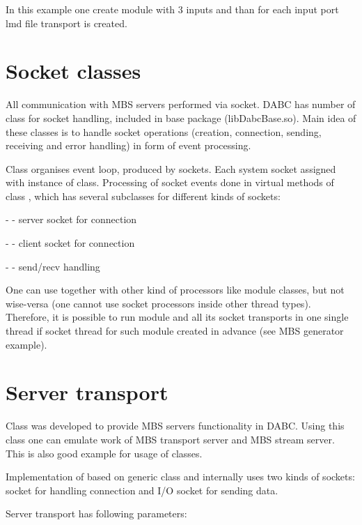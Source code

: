 In this example one create module with 3 inputs and than for each input port lmd file transport is created.


\section{Socket classes}

All communication with MBS servers performed via socket. DABC has number
of class for socket handling, included in base package (libDabcBase.so).
Main idea of these classes is to handle socket operations (creation, connection, sending, receiving and 
error handling) in form of event processing. 

Class  organises event loop, produced by sockets.
Each system socket assigned with instance of  class. 
Processing of socket events done in virtual methods
of class , which has several subclasses for different 
kinds of sockets: 
\bbul
\item  -  - server socket for connection  
\item  -  - client socket for connection  
\item  -  - send/recv handling  
\ebul

One can use  together with other kind of processors
like module classes, but not wise-versa (one cannot use socket processors inside other
thread types). Therefore, it is possible to run module and all its
socket transports in one single thread if socket thread for such module created in
advance (see MBS generator example).
  

\section{Server transport}

Class  was developed to provide MBS servers functionality in DABC.
Using this class one can emulate work of MBS transport server and MBS stream server. 
This is also good example for usage of  classes.

Implementation of  based on generic class  and 
internally uses two kinds of sockets: socket for handling connection and I/O socket for 
sending data.
  
Server transport has following parameters:

